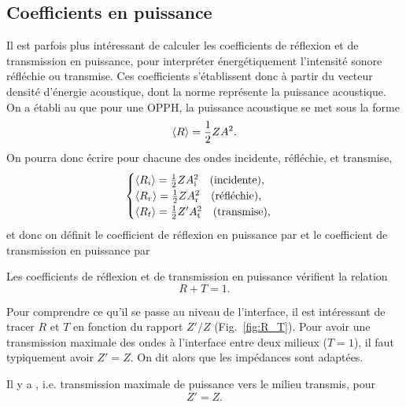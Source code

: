 \documentclass[12pt,fancy]{cours}%
\begin{document}
\subsection{Coefficients en puissance}
Il est parfois plus intéressant de calculer les coefficients de réflexion et de transmission en puissance, pour interpréter énergétiquement l'intensité sonore réfléchie ou transmise. Ces coefficients s'établissent donc à partir du vecteur densité d'énergie acoustique, dont la norme représente la puissance acoustique. On a établi au  que pour une OPPH, la puissance acoustique se met sous la forme
\begin{equation}
\left\langle {R} \right\rangle=\frac{1}{2}Z A^2.
\end{equation}
On pourra donc écrire pour chacune des ondes incidente, réfléchie, et transmise,
\begin{equation}
\begin{cases}
\left\langle {R_i} \right\rangle=\frac{1}{2}Z A_{\rm{i}}^2 \quad (\text{incidente}), \\
\left\langle {R_r} \right\rangle=\frac{1}{2}Z A_{\rm{r}}^2 \quad (\text{réfléchie}), \\
\left\langle {R_t} \right\rangle=\frac{1}{2}Z' A_{\rm{t}}^2 \quad (\text{transmise}),
\end{cases}
\end{equation}
et donc on définit le coefficient de réflexion en puissance par
et le coefficient de transmission en puissance par

\begin{prop}\label{prop:}
  Les coefficients de réflexion et de transmission en puissance vérifient la relation
$$
R+T=1.
$$
\end{prop}


Pour comprendre ce qu'il se passe au niveau de l'interface, il est intéressant de tracer $R$ et $T$ en fonction du rapport $Z'/Z$ (Fig.~\ref{fig:R_T}).
Pour avoir une transmission maximale des ondes à l'interface entre deux milieux ($T = 1$), il faut typiquement avoir $Z' = Z$. On dit alors que les impédances sont adaptées.
\begin{prop}\label{prop:}
Il y a , i.e. transmission maximale de puissance vers le milieu transmis, pour
$$
Z' = Z.
$$
\end{prop}
\end{document}
